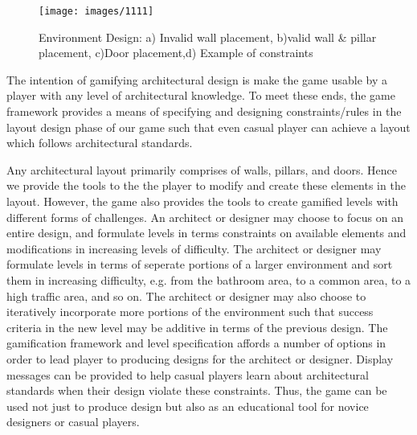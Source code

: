\begin{figure*} \texttt{[image: images/1111]}
	\caption{Environment Design: a) Invalid wall placement, b)valid wall \& pillar placement, c)Door placement,d) Example of constraints}  
\end{figure*}

The intention of gamifying architectural design is make the game usable by a player with any level of architectural knowledge. To meet these ends, the game framework provides a means of specifying and designing constraints/rules in the layout design phase of our game such that even casual player can achieve a layout which follows architectural standards.

Any architectural layout primarily comprises of walls, pillars, and doors. Hence we provide the tools to the the player to modify and create these elements in the layout. However, the game also provides the tools to create gamified levels with different forms of challenges. An architect or designer may choose to focus on an entire design, and formulate levels in terms constraints on available elements and modifications in increasing levels of difficulty.  The architect or designer may formulate levels in terms of seperate portions of a larger environment and sort them in increasing difficulty, e.g. from the bathroom area, to a common area, to a high traffic area, and so on. The architect or designer may also choose to iteratively incorporate more portions of the environment such that success criteria in the new level may be additive in terms of the previous design.  The gamification framework and level specification affords a number of options in order to lead player to producing designs for the architect or designer.  Display messages can be provided to help casual players learn about architectural standards when their design violate these constraints. Thus, the game can be used not just to produce design but also as an educational tool for novice designers or casual players.
